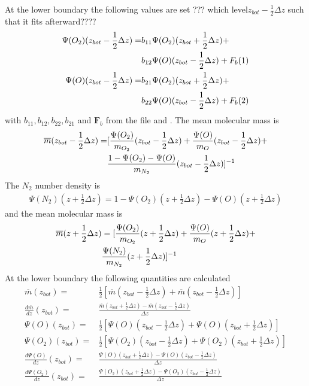 At the lower boundary the following values are set ??? which
level$z_{bot}-\frac{1}{2}\Delta z$ such that it fits afterward????
%
\begin{align}
  \Psi(O_2)(z_{bot}-\frac{1}{2}\Delta z)=&  b_{11}\Psi(O_2)(z_{bot}+\frac{1}{2}\Delta z)
      + \notag \\
      {} & b_{12}\Psi(O)(z_{bot}-\frac{1}{2}\Delta z) + F_b(1) \\
  \Psi(O)(z_{bot}-\frac{1}{2}\Delta z)= & b_{21}\Psi(O_2)(z_{bot}+\frac{1}{2}\Delta z)
      + \notag \\
      {} & b_{22}\Psi(O)(z_{bot}-\frac{1}{2}\Delta z) + F_b(2)
\end{align}
%
with $b_{11}, b_{12}, b_{22}, b_{21}$ and $\mathbf{F}_b$ from the
file  and . The mean molecular
mass is
%
\begin{align}
  \overline{m}(z_{bot}-\frac{1}{2}\Delta z) =&  [ \frac{\Psi(O_2)}{m_{O_2}}(z_{bot}-\frac{1}{2}\Delta z)
     +  \frac{\Psi(O)}{m_{O}} (z_{bot}-\frac{1}{2}\Delta z)+ \notag \\
     {} &
     \frac{1-\Psi(O_2)-\Psi(O)}{m_{N_2}}(z_{bot}-\frac{1}{2}\Delta z) ]^{-1}
\end{align}
%
The $N_2$ number density is
%
\begin{align}
  \Psi(N_2)(z+\frac{1}{2} \Delta z) =1- \Psi(O_2)(z+\frac{1}{2} \Delta z)-
     \Psi(O)(z+\frac{1}{2} \Delta z)
\end{align}
%
and the mean molecular mass is
%
\begin{align}
  \overline{m}(z+\frac{1}{2}\Delta z) & = [ \frac{\Psi(O_2)}{m_{O_2}}(z+\frac{1}{2}\Delta z)
     +  \frac{\Psi(O)}{m_{O}} (z+\frac{1}{2}\Delta z)+ \notag \\
    {} &  \frac{\Psi(N_2)}{m_{N_2}}(z+\frac{1}{2}\Delta z) ]^{-1}
\end{align}
%
At the lower boundary the following quantities are calculated
%
\begin{align}
  \overline{m}(z_{bot}) = & \frac{1}{2}[\overline{m}(z_{bot}-\frac{1}{2}\Delta z)+
  \overline{m}(z_{bot}-\frac{1}{2}\Delta z)] \\
  \frac{d \overline{m}}{dz}(z_{bot}) = & \frac{\overline{m}(z_{bot}+\frac{1}{2}\Delta z)
     - \overline{m}(z_{bot}-\frac{1}{2}\Delta z)}{\Delta z} \\
  \Psi(O)(z_{bot})= &\frac{1}{2}[\Psi(O)(z_{bot}-\frac{1}{2}\Delta z)+
    \Psi(O)(z_{bot}+\frac{1}{2}\Delta z)] \\
  \Psi(O_2)(z_{bot})= &\frac{1}{2}[\Psi(O_2)(z_{bot}-\frac{1}{2}\Delta z)+
    \Psi(O_2)(z_{bot}+\frac{1}{2}\Delta z)] \\
  \frac{d \Psi(O)}{dz}(z_{bot}) = & \frac{\Psi(O)(z_{bot}+\frac{1}{2}\Delta z)
     - \Psi(O)(z_{bot}-\frac{1}{2}\Delta z)}{\Delta z} \\
  \frac{d \Psi(O_2)}{dz}(z_{bot}) = & \frac{\Psi(O_2)(z_{bot}+\frac{1}{2}\Delta z)
     - \Psi(O_2)(z_{bot}-\frac{1}{2}\Delta z)}{\Delta z}
\end{align}
